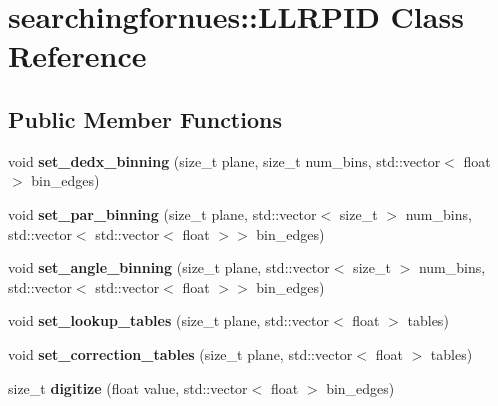 \hypertarget{classsearchingfornues_1_1LLRPID}{}\section{searchingfornues\+:\+:L\+L\+R\+P\+ID Class Reference}
\label{classsearchingfornues_1_1LLRPID}
\subsection*{Public Member Functions}
\begin{DoxyCompactItemize}
\item 
void {\bfseries set\+\_\+dedx\+\_\+binning} (size\+\_\+t plane, size\+\_\+t num\+\_\+bins, std\+::vector$<$ float $>$ bin\+\_\+edges)\hypertarget{classsearchingfornues_1_1LLRPID_aa8fb15d37ae277de14b449ee3d734b4b}{}\label{classsearchingfornues_1_1LLRPID_aa8fb15d37ae277de14b449ee3d734b4b}

\item 
void {\bfseries set\+\_\+par\+\_\+binning} (size\+\_\+t plane, std\+::vector$<$ size\+\_\+t $>$ num\+\_\+bins, std\+::vector$<$ std\+::vector$<$ float $>$$>$ bin\+\_\+edges)\hypertarget{classsearchingfornues_1_1LLRPID_a9823701e9059de54a55cf8d180a3c42d}{}\label{classsearchingfornues_1_1LLRPID_a9823701e9059de54a55cf8d180a3c42d}

\item 
void {\bfseries set\+\_\+angle\+\_\+binning} (size\+\_\+t plane, std\+::vector$<$ size\+\_\+t $>$ num\+\_\+bins, std\+::vector$<$ std\+::vector$<$ float $>$$>$ bin\+\_\+edges)\hypertarget{classsearchingfornues_1_1LLRPID_a46046b89a9e7c92b58eb162561c8acc9}{}\label{classsearchingfornues_1_1LLRPID_a46046b89a9e7c92b58eb162561c8acc9}

\item 
void {\bfseries set\+\_\+lookup\+\_\+tables} (size\+\_\+t plane, std\+::vector$<$ float $>$ tables)\hypertarget{classsearchingfornues_1_1LLRPID_a8596d9156bc1771641c3245e9cd71a94}{}\label{classsearchingfornues_1_1LLRPID_a8596d9156bc1771641c3245e9cd71a94}

\item 
void {\bfseries set\+\_\+correction\+\_\+tables} (size\+\_\+t plane, std\+::vector$<$ float $>$ tables)\hypertarget{classsearchingfornues_1_1LLRPID_a6abcb27f30a4e5086ecc60a0e944d9a0}{}\label{classsearchingfornues_1_1LLRPID_a6abcb27f30a4e5086ecc60a0e944d9a0}

\item 
size\+\_\+t {\bfseries digitize} (float value, std\+::vector$<$ float $>$ bin\+\_\+edges)\hypertarget{classsearchingfornues_1_1LLRPID_af605394ef38223a1600904c181828486}{}\label{classsearchingfornues_1_1LLRPID_af605394ef38223a1600904c181828486}


\end{DoxyCompactItemize}
